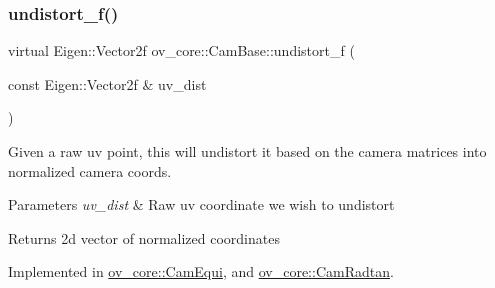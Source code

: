 \subsubsection{\texorpdfstring{undistort\+\_\+f()}{undistort\_f()}}
{\footnotesize\ttfamily virtual Eigen\+::\+Vector2f ov\+\_\+core\+::\+Cam\+Base\+::undistort\+\_\+f (\begin{DoxyParamCaption}\item[{const Eigen\+::\+Vector2f \&}]{uv\+\_\+dist }\end{DoxyParamCaption})\hspace{0.3cm}{\ttfamily [pure virtual]}}



Given a raw uv point, this will undistort it based on the camera matrices into normalized camera coords. 


\begin{DoxyParams}{Parameters}
{\em uv\+\_\+dist} & Raw uv coordinate we wish to undistort \\
\hline
\end{DoxyParams}
\begin{DoxyReturn}{Returns}
2d vector of normalized coordinates 
\end{DoxyReturn}


Implemented in \hyperlink{classov__core_1_1CamEqui_a737d6b4b634ae1da976d362158323059}{ov\+\_\+core\+::\+Cam\+Equi}, and \hyperlink{classov__core_1_1CamRadtan_af02fa84ed2fdc895aaaf216184aa25ef}{ov\+\_\+core\+::\+Cam\+Radtan}.

